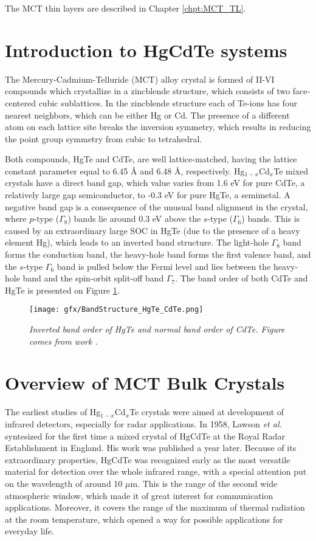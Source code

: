 \documentclass[titlepage,a4paper]{book}
\newcommand{\wciecie}{\quad\phantom{v}}
\begin{document}
The MCT thin layers are described in Chapter \ref{chpt:MCT_TL}.  

\section{Introduction to HgCdTe systems}
\wciecie
The Mercury-Cadmium-Telluride (MCT) alloy crystal is formed of II-VI compounds which crystallize in a zincblende structure, which consists of two face-centered cubic sublattices. In the zincblende structure each of Te-ions has four nearest neighbors, which can be either Hg or Cd. The presence of a different atom on each lattice site breaks the inversion symmetry, which results in reducing the point group symmetry from cubic to tetrahedral. 

Both compounds, HgTe and CdTe, are well lattice-matched, having the lattice constant parameter equal to 6.45 Å and 6.48 Å, respectively. Hg$_{1-x}$Cd$_x$Te mixed crystals have a direct band gap, which value varies from 1.6 eV for pure CdTe, a relatively large gap semiconductor, to -0.3 eV for pure HgTe, a semimetal. A negative band gap is a consequence of the unusual band alignment in the crystal, where $p$-type ($\Gamma_8$) bands lie around 0.3 eV above the $s$-type ($\Gamma_6$) bands. This is caused by an extraordinary large SOC in HgTe (due to the presence of a heavy element Hg), which leads to an inverted band structure. The light-hole $\Gamma_8$ band forms the conduction band, the heavy-hole band forms the first valence band, and the $s$-type $\Gamma_6$ band is pulled below the Fermi level and lies between the heavy-hole band and the spin-orbit split-off band $\Gamma_7$. The band order of both CdTe and HgTe is presented on Figure \ref{fig:BandStructure_HgTe_CdTe}.

\begin{figure}[ht]
	\centering
	\texttt{[image: gfx/BandStructure\_HgTe\_CdTe.png]}
	\vspace{-10pt}
	\caption{\textit{Inverted band order of HgTe and normal band order of CdTe. Figure comes from work \cite{Bernevig_Topology2}.}}
	\label{fig:BandStructure_HgTe_CdTe}
\end{figure} 

\clearpage
\section{Overview of MCT Bulk Crystals}
\wciecie
The earliest studies of Hg$_{1-x}$Cd$_x$Te crystals were aimed at development of infrared detectors, especially for radar applications. In 1958, Lawson \textit{et al.} syntesized for the first time a mixed crystal of HgCdTe at the Royal Radar Establishment in England. His work was published \cite{Lawson_MCT} a year later. Because of its extraordinary properties, HgCdTe was recognized early as the most versatile material for detection over the whole infrared range, with a special attention put on the wavelength of around 10 $\mu$m. This is the range of the second wide atmospheric window, which made it of great interest for communication applications. Moreover, it covers the range of the maximum of thermal radiation at the room temperature, which opened a way for possible applications for everyday life. 
\end{document}
